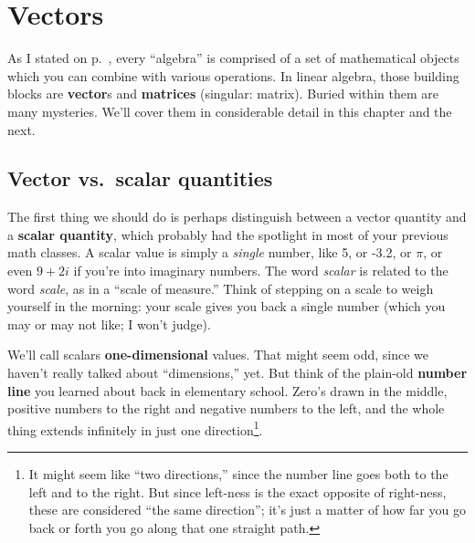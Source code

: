 


\chapter{Vectors}
\label{ch:vectors}

As I stated on p.~\pageref{mathematicalObject}, every ``algebra'' is comprised
of a set of mathematical objects which you can combine with various operations.
In linear algebra, those building blocks are \textbf{vector}s and
\textbf{matrices} (singular: matrix). Buried within them are many mysteries.
We'll cover them in considerable detail in this chapter and the next.

\section{Vector vs.~scalar quantities}


The first thing we should do is perhaps distinguish between a vector quantity
and a \textbf{scalar quantity}, which probably had the spotlight in most of
your previous math classes. A scalar value is simply a \textit{single} number,
like 5, or -3.2, or $\pi$, or even $9 + 2i$ if you're into imaginary numbers.
The word \textit{scalar} is related to the word \textit{scale}, as in a ``scale
of measure.'' Think of stepping on a scale to weigh yourself in the morning:
your scale gives you back a single number (which you may or may not like; I
won't judge).


We'll call scalars \textbf{one-dimensional} values. That might seem odd, since
we haven't really talked about ``dimensions,'' yet. But think of the plain-old
\textbf{number line} you learned about back in elementary school. Zero's drawn
in the middle, positive numbers to the right and negative numbers to the left,
and the whole thing extends infinitely in just one direction\footnote{It might
seem like ``two directions,'' since the number line goes both to the left and
to the right. But since left-ness is the
exact opposite of right-ness, these are considered ``the same direction''; it's
just a matter of how far you go back or forth you go along that one straight
path.}.

